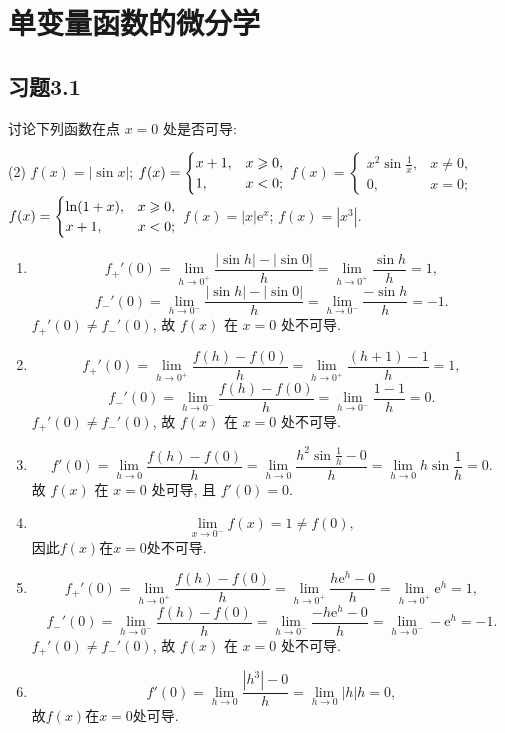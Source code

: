 \chapter{单变量函数的微分学}

\section{习题3.1}

\begin{exercise}[3.1.1]
    讨论下列函数在点 $x=0$ 处是否可导:
    \begin{tasks}[label=(\arabic*)](2)
        \task $f(x) = |\sin x|$;
        \task $f(x) = \begin{cases} x+1, & x \geqslant 0, \\ 1, & x < 0; \end{cases}$
        \task $f(x) = \begin{cases} x^2\sin\frac{1}{x}, & x \ne 0, \\ 0, & x=0; \end{cases}$
        \task $f(x) = \begin{cases} \ln(1+x), & x \geqslant 0, \\ x+1, & x < 0; \end{cases}$
        \task $f(x) = |x|\mathrm{e}^x$;
        \task $f(x) = |x^3|$.
    \end{tasks}
\end{exercise}

\begin{solution}
    \begin{enumerate}
        \item $$ f_+'(0) = \lim_{h \to 0^+} \frac{|\sin h| - |\sin 0|}{h} = \lim_{h \to 0^+} \frac{\sin h}{h} = 1, $$
              $$ f_-'(0) = \lim_{h \to 0^-} \frac{|\sin h| - |\sin 0|}{h} = \lim_{h \to 0^-} \frac{-\sin h}{h} = -1. $$
              $f_+'(0) \ne f_-'(0)$, 故 $f(x)$ 在 $x=0$ 处不可导.
        \item $$ f_+'(0) = \lim_{h \to 0^+} \frac{f(h)-f(0)}{h} = \lim_{h \to 0^+} \frac{(h+1)-1}{h} = 1, $$
              $$ f_-'(0) = \lim_{h \to 0^-} \frac{f(h)-f(0)}{h} = \lim_{h \to 0^-} \frac{1-1}{h} = 0. $$
              $f_+'(0) \ne f_-'(0)$, 故 $f(x)$ 在 $x=0$ 处不可导.
        \item $$ f'(0) = \lim_{h \to 0} \frac{f(h)-f(0)}{h} = \lim_{h \to 0} \frac{h^2\sin\frac{1}{h}-0}{h} = \lim_{h \to 0} h\sin\frac{1}{h} = 0. $$
              故 $f(x)$ 在 $x=0$ 处可导, 且 $f'(0)=0$.
        \item $$ \lim_{x\to 0^-} f(x) = 1 \neq f(0),$$因此$f(x)$在$x=0$处不可导.
        \item $$ f_+'(0) = \lim_{h \to 0^+} \frac{f(h)-f(0)}{h} = \lim_{h \to 0^+} \frac{h\mathrm{e}^h - 0}{h} = \lim_{h \to 0^+} \mathrm{e}^h = 1, $$
              $$ f_-'(0) = \lim_{h \to 0^-} \frac{f(h)-f(0)}{h} = \lim_{h \to 0^-} \frac{-h\mathrm{e}^h - 0}{h} = \lim_{h \to 0^-} -\mathrm{e}^h = -1. $$
              $f_+'(0) \ne f_-'(0)$, 故 $f(x)$ 在 $x=0$ 处不可导.
        \item $$ f'(0) = \lim_{h \to 0}\frac{|h^3| - 0}{h} = \lim_{h \to 0} |h|h = 0,$$故$f(x)$在$x=0$处可导.
    \end{enumerate}
\end{solution}

